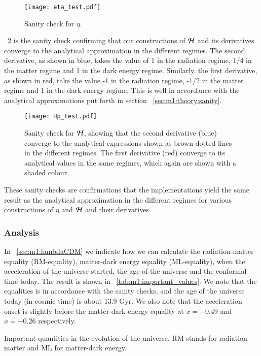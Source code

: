     \begin{figure}
        \texttt{[image: eta\_test.pdf]}
        \caption{Sanity check for $\eta$.}
        \label{fig:m1:eta_tests}
    \end{figure}

    ~\cref{fig:m1:Hp_tests} is the sanity check confirming that our constructions of $\mathcal{H}$ and its derivatives converge to the analytical approximation in the different regimes. The second derivative, as shown in blue, takes the value of 1 in the radiation regime, 1/4 in the matter regime and 1 in the dark energy regime. Similarly, the first derivative, as shown in red, take the value -1 in the radiation regime, -1/2 in the matter regime and 1 in the dark energy regime. This is well in accordance with the analytical approximations put forth in section ~\cref{sec:m1:theory:sanity}. 

    \begin{figure}
        \texttt{[image: Hp\_test.pdf]}
        \caption{Sanity check for $\mathcal{H}$, showing that the second derivative (blue) converge to the analytical expressions shown as brown dotted lines in the different regimes. The first derivative (red) converge to its analytical values in the same regimes, which again are shown with a shaded colour.}
        \label{fig:m1:Hp_tests}
    \end{figure}

    These sanity checks are confirmations that the implementations yield the same result as the analytical approximation in the different regimes for various constructions of $\eta$ and $\mathcal{H}$ and their derivatives.
    
\subsubsection{Analysis}

    In ~\cref{sec:m1:lambdaCDM} we indicate how we can calculate the radiation-matter equality (RM-equality), matter-dark energy equality (ML-equality), when the acceleration of the universe started, the age of the universe and the conformal time today. The result is shown in ~\cref{tab:m1:important_values}. We note that the equalities is in accordance with the sanity checks, and the age of the universe today (in cosmic time) is about 13.9 Gyr. We also note that the acceleration onset is slightly before the matter-dark energy equality at $x=-0.49$ and $x=-0.26$ respectively. 
    \begin{table}
        
        \caption{Important quantities in the evolution of the universe. RM stands for radiation-matter and ML for matter-dark energy.}
        \label{tab:m1:important_values}
    \end{table}

